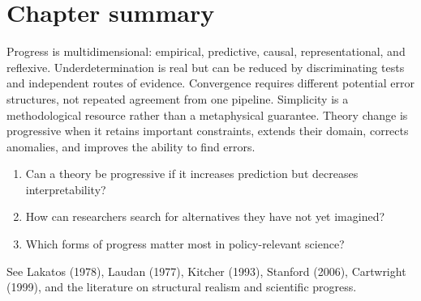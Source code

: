 \section*{Chapter summary}

Progress is multidimensional: empirical, predictive, causal,
representational, and reflexive. Underdetermination is real but can be reduced
by discriminating tests and independent routes of evidence. Convergence requires
different potential error structures, not repeated agreement from one pipeline.
Simplicity is a methodological resource rather than a metaphysical guarantee.
Theory change is progressive when it retains important constraints, extends
their domain, corrects anomalies, and improves the ability to find errors.

\begin{discussion}
\begin{enumerate}
\item Can a theory be progressive if it increases prediction but decreases
interpretability?
\item How can researchers search for alternatives they have not yet imagined?
\item Which forms of progress matter most in policy-relevant science?
\end{enumerate}
\end{discussion}

\begin{furtherreading}
See Lakatos (1978), Laudan (1977), Kitcher (1993), Stanford (2006),
Cartwright (1999), and the literature on structural realism and scientific
progress.
\end{furtherreading}


